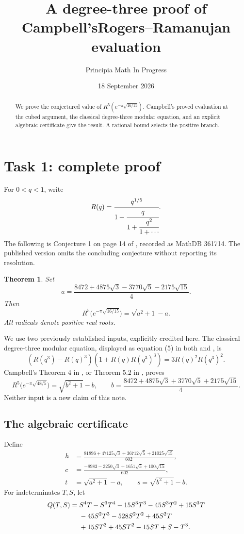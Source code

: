 \documentclass[11pt]{article}
\title{A degree-three proof of Campbell's\newline Rogers--Ramanujan evaluation}
\author{Principia Math In Progress}
\date{18 September 2026}
\newtheorem{theorem}{Theorem}
\begin{document}
\maketitle
\begin{abstract}
We prove the conjectured value of $R^5(e^{-\pi\sqrt{16/15}})$.
Campbell's proved evaluation at the cubed argument, the classical
degree-three modular equation, and an explicit algebraic certificate
give the result. A rational bound selects the positive branch.
\end{abstract}

\section*{Task 1: complete proof}
For $0<q<1$, write
\[
 R(q)=\cfrac{q^{1/5}}{1+\cfrac{q}{1+\cfrac{q^2}{1+\cdots}}}.
\]
The following is Conjecture 1 on page 14 of \cite{preprint},
recorded as MathDB 361714. The published version \cite{final}
omits the concluding conjecture without reporting its resolution.

\begin{theorem}
Set
\[
 a=\frac{8472+4875\sqrt3-3770\sqrt5-2175\sqrt{15}}4.
\]
Then
\[
 R^5\bigl(e^{-\pi\sqrt{16/15}}\bigr)=\sqrt{a^2+1}-a.
\]
All radicals denote positive real roots.
\end{theorem}

We use two previously established inputs, explicitly credited here.
The classical degree-three modular equation, displayed as equation (5)
in both \cite{preprint} and \cite{final}, is
\begin{equation}\label{modular}
 (R(q^3)-R(q)^3)(1+R(q)R(q^3)^3)=3R(q)^2R(q^3)^2.
\end{equation}
Campbell's Theorem 4 in \cite{preprint}, or Theorem 5.2 in
\cite{final}, proves
\begin{equation}\label{known}
 R^5\bigl(e^{-\pi\sqrt{48/5}}\bigr)=\sqrt{b^2+1}-b,
 \qquad
 b=\frac{8472+4875\sqrt3+3770\sqrt5+2175\sqrt{15}}4.
\end{equation}
Neither input is a new claim of this note.

\subsection*{The algebraic certificate}
Define
\begin{align}
 h&=\frac{81896+47125\sqrt3+36712\sqrt5+21025\sqrt{15}}{602},\label{h}\\
 c&=\frac{-8983-3250\sqrt3+1651\sqrt5+100\sqrt{15}}{602},\label{c}\\
 t&=\sqrt{a^2+1}-a,\qquad s=\sqrt{b^2+1}-b.\label{ts}
\end{align}
For indeterminates $T,S$, let
\begin{align}
 Q(T,S)={}&S^4T-S^3T^4-15S^3T^3-45S^3T^2+15S^3T\notag\\
 &-45S^2T^3-528S^2T^2+45S^2T\notag\\
 &+15ST^3+45ST^2-15ST+S-T^3.\label{Q}
\end{align}
\end{document}
